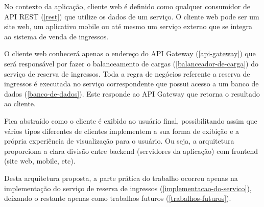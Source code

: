 No contexto da aplicação, cliente web é definido como qualquer consumidor
de API REST (\autoref{rest}) que utilize os dados de um serviço.
O cliente web pode ser um site web, um aplicativo mobile ou até mesmo um serviço
externo que se integra ao sistema de venda de ingressos.

O cliente web conhecerá apenas o endereço do API Gateway (\autoref{api-gateway})
que será responsável por fazer o balanceamento de cargas
(\autoref{balanceador-de-carga}) do serviço de reserva de ingressos.
Toda a regra de negócios referente a reserva de ingressos é executada no
serviço correspondente que possui acesso a um banco de dados (\autoref{banco-de-dados}).
Este responde ao API Gateway que retorna o resultado ao cliente.

Fica abstraído como o cliente é exibido ao usuário
final, possibilitando assim que vários tipos diferentes de clientes implementem
a sua forma de exibição e a própria experiência de visualização para o usuário.
Ou seja, a arquitetura proporciona a clara divisão entre backend
(servidores da aplicação) com frontend (site web, mobile, etc).

Desta arquitetura proposta, a parte prática do trabalho ocorreu apenas na
implementação do serviço de reserva de ingressos (\autoref{implementacao-do-servico}),
deixando o restante apenas como trabalhos futuros (\autoref{trabalhos-futuros}).
